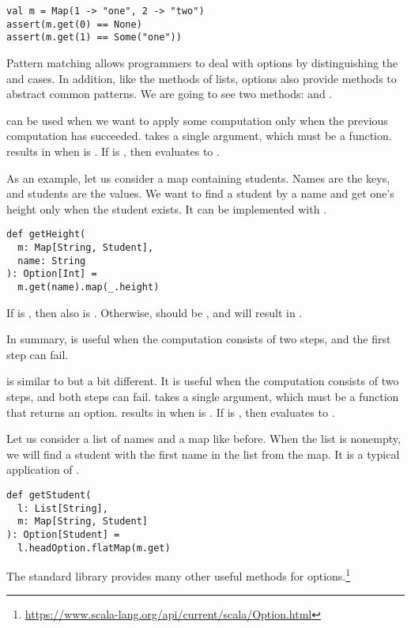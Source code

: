 \begin{verbatim}
val m = Map(1 -> "one", 2 -> "two")
assert(m.get(0) == None)
assert(m.get(1) == Some("one"))
\end{verbatim}

Pattern matching allows programmers to deal with options by
distinguishing the  and  cases. In addition, like the
methods of lists, options also provide methods to abstract common patterns.
We are going to see two methods:  and .

 can be used when we want to apply some computation only when the
previous computation has succeeded.  takes a single argument, which
must be a function.  results in  when  is
. If  is , then  evaluates
to .

As an example, let us consider a map containing students.
Names are the keys, and students are the values. We want to find a student by a name and
get one's height only when the student exists. It can be implemented with
.

\begin{verbatim}
def getHeight(
  m: Map[String, Student],
  name: String
): Option[Int] =
  m.get(name).map(_.height)
\end{verbatim}

If  is , then  also
is . Otherwise,  should be , and
 will result in .

In summary,  is useful when the computation consists of two steps, and
the first step can fail.

 is similar to  but a bit different. It is useful when
the computation consists of two steps, and both steps can fail.
 takes a single argument, which must be a function that returns an option.
 results in  when  is
. If  is , then  evaluates
to .

Let us consider a list of names and a map like before.
When the list is nonempty, we will find a student with the first name in the
list from the map. It is a typical application of .

\begin{verbatim}
def getStudent(
  l: List[String],
  m: Map[String, Student]
): Option[Student] =
  l.headOption.flatMap(m.get)
\end{verbatim}

The standard library provides many other useful methods for
options.\footnote{\url{https://www.scala-lang.org/api/current/scala/Option.html}}
